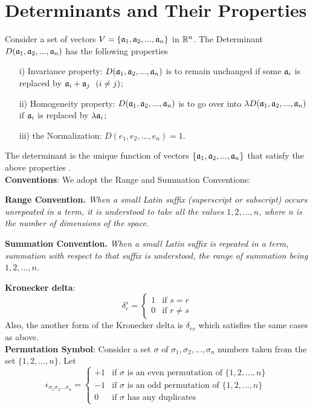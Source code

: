 \section{Determinants and Their Properties}
Consider a set of vectors $V = \{ \mathfrak{a}_1, \mathfrak{a}_2, ...,\mathfrak{a}_n\}$ in $\mathbb{R}^n$.
The Determinant $D(\mathfrak{a}_1,\mathfrak{a}_2,...,\mathfrak{a}_n)$ has the following properties
\begin{itemize}
\item[i)] Invariance property: $D(\mathfrak{a}_1,\mathfrak{a}_2,...,\mathfrak{a}_n)$ is to remain unchanged if some $\mathfrak{a}_i$ is replaced by $\mathfrak{a}_i+\mathfrak{a}_j ~~(i \ne j)$;
\item[ii)] Homogeneity property: $D(\mathfrak{a}_1,\mathfrak{a}_2,...,\mathfrak{a}_n)$ is to go over into $\lambda D(\mathfrak{a}_1,\mathfrak{a}_2,...,\mathfrak{a}_n)$ if $\mathfrak{a}_i$ is replaced by $\lambda \mathfrak{a}_i$;
\item[iii)] the Normalization: $D(e_1, e_2,..., e_n) = 1$.
\end{itemize} The determinant is the unique function of vectors $\{ \mathfrak{a}_1, \mathfrak{a}_2, ...,\mathfrak{a}_n\}$ that satisfy the above properties \cite{Schreier and Sperner}.\\

{\bf Conventions}: We adopt the Range and Summation Conventions:

\begin{definition}
{\bf Range Convention.} {\it When a small Latin suffix (superscript or subscript) occurs unrepeated in a term, it is understood to take all the values
$1,2,...,n$, where n is the number of dimensions of the space.} 
\end{definition} 

\begin{definition}
{\bf Summation Convention.} {\it When a small Latin suffix is repeated in a term, summation with respect to that suffix is understood, the range of summation
being $1,2,...,n$.}
\end{definition}

{\bf Kronecker delta}:
\[ \delta^s_r = \begin{cases} 1 & \mbox{if } s = r \\0 & \mbox{if } r \ne s\end{cases} \]
Also, the another form of the  Kronecker delta is $\delta_{rs}$ which satisfies the same cases as above. \\

{\bf Permutation Symbol}: Consider a set $\sigma$ of $\sigma_1, \sigma_2, ..., \sigma_n$ numbers taken from the set $\{1,2,...,n\}$. Let 
\[ \epsilon_{\sigma_1\sigma_2...\sigma_n}  = 
\begin{cases}
+1 & \mbox{if }\sigma  \mbox{ is an even permutation of $\{1, 2, ..., n\}$}\\ 
-1 & \mbox{if }\sigma  \mbox{ is an odd permutation of $\{1, 2, ..., n\}$}\\
0  & \mbox{if }\sigma  \mbox{ has any duplicates}
\end{cases} \]

